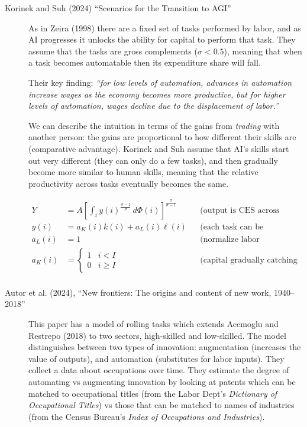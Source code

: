 \documentclass[
  11pt,
  letterpaper,
  DIV=11,
  numbers=noendperiod,
  oneside]{scrartcl}
\begin{document}
\begin{description}
\item[Korinek and Suh (2024) ``Scenarios for the Transition to AGI'']
As in Zeira (1998) there are a fixed set of tasks performed by labor,
and as AI progresses it unlocks the ability for capital to perform that
task. They assume that the tasks are gross complements (\(\sigma<0.5\)),
meaning that when a task becomes automatable then its expenditure share
will fall.

Their key finding: \emph{``for low levels of automation, advances in
automation increase wages as the economy becomes more productive, but
for higher levels of automation, wages decline due to the displacement
of labor.''}

We can describe the intuition in terms of the gains from \emph{trading}
with another person: the gains are proportional to how different their
skills are (comparative advantage). Korinek and Suh assume that AI's
skills start out very different (they can only do a few tasks), and then
gradually become more similar to human skills, meaning that the relative
productivity across tasks eventually becomes the same.

\[\begin{aligned}
  Y &= A \left[ \int_i y(i)^{\frac{\sigma-1}{\sigma}} \, d\Phi(i) \right]^{\frac{\sigma}{\sigma-1}}
     && \text{(output is CES across tasks)}\\
  y(i) &= a_K(i)k(i) + a_L(i)\ell(i)
     && \text{(each task can be performed by capital or labor)}\\
  a_L(i) &= 1 && \text{(normalize labor productivity to 1)}\\
  a_K(i) &= \begin{cases}1&i<I\\0&i\geq I\end{cases} && \text{(capital gradually catching up)}\\
   \end{aligned}\]
\item[Autor et al. (2024), ``New frontiers: The origins and content of
new work, 1940--2018'']
This paper has a model of rolling tasks which extends Acemoglu and
Restrepo (2018) to two sectors, high-skilled and low-skilled. The model
distinguishes between two types of innovation: augmentation (increases
the value of outputs), and automation (substitutes for labor inputs).
They collect a data about occupations over time. They estimate the
degree of automating vs augmenting innovation by looking at patents
which can be matched to occupational titles (from the Labor Dept's
\emph{Dictionary of Occupational Titles}) vs those that can be matched
to names of industries (from the Census Bureau's \emph{Index of
Occupations and Industries}).


\end{description}
\end{document}
